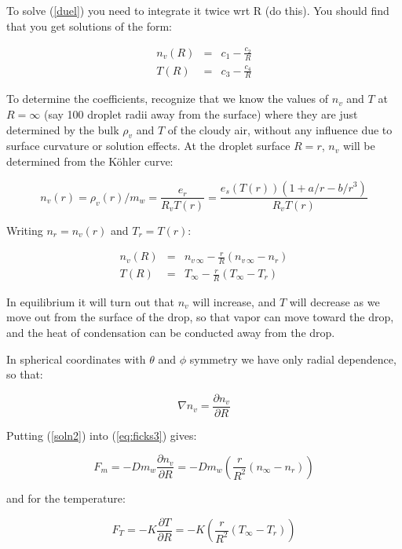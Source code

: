 \documentclass[12pt]{article}
\begin{document}
To solve (\ref{duel}) you need to integrate it twice wrt R (do this).
You should find that you get solutions of the form:

\begin{eqnarray}
  \label{soln}
  n_v(R) &=& c_1 - \frac{c_2}{R} \nonumber\\
  T(R) &=& c_3 - \frac{c_4}{R}
\end{eqnarray}

To determine the coefficients, recognize that we know the values of
$n_v$ and $T$ at $R=\infty$ (say 100 droplet radii away from the
surface) where they are just determined by the bulk $\rho_v$ and $T$
of the cloudy air, without any influence due to surface curvature or
solution effects.  At the droplet surface $R=r$, $n_v$ will be
determined from the K\"ohler curve: 

\begin{equation}
  \label{rhovr}
   n_v(r)= \rho_v(r)/m_w= \frac{e_r}{R_v T(r)}=\frac{e_s(T(r))(1 + a/r -
     b/r^3)}{R_v T(r)}
\end{equation}

Writing $n_r=n_v(r)$ and $T_r=T(r)$:

\begin{eqnarray}
  \label{soln2}
  n_v(R) &=& n_{v\,\infty} - \frac{r}{R}(n_{v\,\infty} - n_r) \nonumber\\
  T(R) &=& T_\infty - \frac{r}{R}(T_\infty - T_r)
\end{eqnarray}

In equilibrium it will turn out that $n_v$ will increase, and $T$ will
decrease as we move out from the surface of the drop, so that vapor
can move toward the drop, and the heat of condensation can be
conducted away from the drop.

In spherical coordinates with $\theta$ and $\phi$ symmetry we have
only radial dependence, so that:

\begin{equation}
  \label{symm}
  \nabla n_v = \frac{\partial n_v}{\partial R}
\end{equation}

Putting (\ref{soln2}) into (\ref{eq:ficks3}) gives:

\begin{equation}
  \label{fluxes}
  F_m = -D m_w \frac{\partial n_v}{\partial R} = -D m_w ( \frac{r}{R^2}
  (n_\infty - n_r))
\end{equation}

\noindent
and for the temperature:

\begin{equation}
  \label{fluxes2}
  F_T = -K \frac{\partial T}{\partial R} = -K ( \frac{r}{R^2}
  (T_\infty - T_r))
\end{equation}
\end{document}
